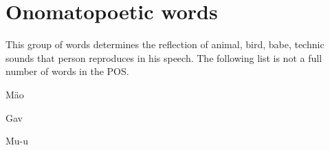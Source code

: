 \section{Onomatopoetic words}

This group of words determines the reflection of animal, bird, babe, technic sounds that person reproduces in his speech. The following list is not a full number of words in the POS.

Mäo

Gav

Mu-u

